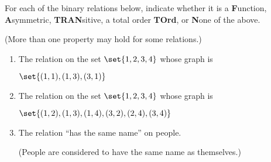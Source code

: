 \documentclass[quiz]{mcs}
\begin{document}
\begin{problem}[3]
For each of the binary relations below, indicate whether it is a
\textbf{F}unction, \textbf{A}symmetric, \textbf{TRAN}sitive, a total order
\textbf{TOrd}, or \textbf{N}one of the above.

\iffalse
 \textbf{R}eflexive,
\textbf{A}ntisymmetric, \textbf{TRAN}sitive, \textbf{TOT}al, or
\textbf{N}one of the above.
\fi

\iffalse

\begin{tabular}{l}
A \textbf{F}unction,\\
\textbf{A}symmetric,\\
\textbf{TRAN}sitive,\\
a total order \textbf{TOrd} or\\
\textbf{N}one of the above.
\end{tabular}
\fi


(More than one property may hold for some relations.)
\begin{enumerate}

\item
The relation on the set $\set{1,2,3,4}$ whose graph is

$\set{(1,1),(1,3),(3,1)}$ \hfill \brule{1.5in}

\item The relation on the set $\set{1,2,3,4}$ whose graph is

$\set{(1,2), (1,3), (1,4), (3,2), (2,4), (3,4)}$ \hfill \brule{1.5in}

\item The relation ``has the same name'' on people.   \hfill \brule{1.5in}

(People are considered to have the same name as themselves.)
\end{enumerate}


\end{problem}
\end{document}
